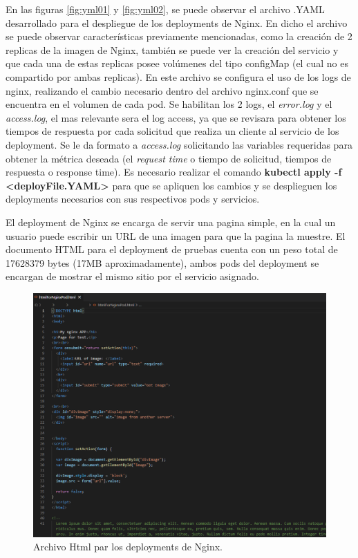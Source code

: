 \par En las figuras \ref{fig:yml01} y \ref{fig:yml02}, se puede observar el archivo .YAML desarrollado para el despliegue de los deployments de Nginx. En dicho el archivo se puede observar características previamente mencionadas, como la creación de 2 replicas de la imagen de Nginx, también se puede ver la creación del servicio y que cada una de estas replicas posee volúmenes del tipo configMap (el cual no es compartido por ambas replicas). En este archivo se configura el uso de los logs de nginx, realizando el cambio necesario dentro del archivo nginx.conf que se encuentra en el volumen de cada pod. Se habilitan los 2 logs, el \textit{error.log} y el \textit{access.log}, el mas relevante sera el log access, ya que se revisara para obtener los tiempos de respuesta por cada solicitud que realiza un cliente al servicio de los deployment. Se le da formato a \textit{access.log} solicitando las variables requeridas para obtener la métrica deseada (el \textit{request time} o tiempo de solicitud, tiempos de respuesta o response time). Es necesario realizar el comando \textbf{kubectl apply -f <deployFile.YAML>} para que se apliquen los cambios y se desplieguen los deployments necesarios con sus respectivos pods y servicios.\\

\par El deployment de Nginx se encarga de servir una pagina simple, en la cual un usuario puede escribir un URL de una imagen para que la pagina la muestre. El documento HTML para el deployment de pruebas cuenta con un peso total de 17628379 bytes (17MB aproximadamente), ambos pods del deployment se encargan de mostrar el mismo sitio por el servicio asignado.\\

\begin{figure}[htpb!]
	\centering
	\includegraphics[width=0.95\columnwidth]{images/captures/podnginx/html01.PNG}
	\caption{Archivo Html par los deployments de Nginx.}
	\label{fig:html01}
\end{figure}

